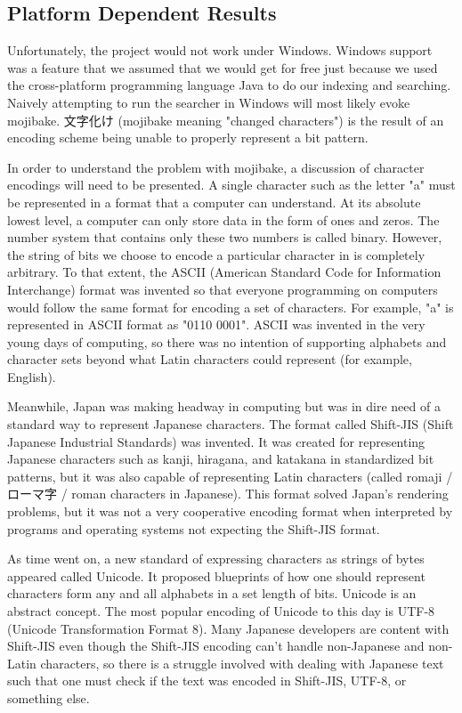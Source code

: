 \documentclass{acm} %
\begin{document}
\begin{CJK}{UTF8}{zhsong}
\subsection{Platform Dependent Results}

Unfortunately, the project would not work under Windows. Windows support was a feature that we assumed that we would get for free just because we used the cross-platform programming language Java to do our indexing and searching. Naively attempting to run the searcher in Windows will most likely evoke mojibake. 文字化け (mojibake meaning "changed characters") is the result of an encoding scheme being unable to properly represent a bit pattern.

In order to understand the problem with mojibake, a discussion of character encodings will need to be presented. A single character such as the letter "a" must be represented in a format that a computer can understand. At its absolute lowest level, a computer can only store data in the form of ones and zeros. The number system that contains only these two numbers is called binary. However, the string of bits we choose to encode a particular character in is completely arbitrary. To that extent, the ASCII (American Standard Code for Information Interchange) format was invented so that everyone programming on computers would follow the same format for encoding a set of characters. For example, "a" is represented in ASCII format as "0110 0001". ASCII was invented in the very young days of computing, so there was no intention of supporting alphabets and character sets beyond what Latin characters could represent (for example, English).

Meanwhile, Japan was making headway in computing but was in dire need of a standard way to represent Japanese characters. The format called Shift-JIS (Shift Japanese Industrial Standards) was invented. It was created for representing Japanese characters such as kanji, hiragana, and katakana in standardized bit patterns, but it was also capable of representing Latin characters (called romaji / ローマ字 / roman characters in Japanese). This format solved Japan's rendering problems, but it was not a very cooperative encoding format when interpreted by programs and operating systems not expecting the Shift-JIS format.

As time went on, a new standard of expressing characters as strings of bytes appeared called Unicode. It proposed blueprints of how one should represent characters form any and all alphabets in a set length of bits. Unicode is an abstract concept. The most popular encoding of Unicode to this day is UTF-8 (Unicode Transformation Format 8). Many Japanese developers are content with Shift-JIS even though the Shift-JIS encoding can't handle non-Japanese and non-Latin characters, so there is a struggle involved with dealing with Japanese text such that one must check if the text was encoded in Shift-JIS, UTF-8, or something else.


\end{CJK}
\end{document}
